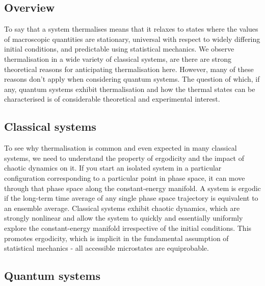 \documentclass[a4paper,10pt]{article}
\begin{document}
 \subsection{Overview}
 
To say that a system thermalises means that it relaxes to states where the values of macroscopic quantities are stationary, universal with respect to 
widely differing initial conditions, and predictable using statistical mechanics\cite{Rigol2008}. We observe thermalisation in a wide variety of classical systems, are there 
are strong theoretical reasons for anticipating thermalisation here. However, many of these reasons don't apply when considering quantum systems. The question of 
which, if any, quantum systems exhibit thermalisation and how the thermal states can be characterised is of considerable theoretical and experimental interest. 

 \subsection{Classical systems}
To see why thermalisation is common and even expected in many classical systems, we need to understand the property of ergodicity and the impact of chaotic dynamics on it. 
If you start an isolated system in a particular configuration corresponding to a particular point in phase space, it can move through that phase space along the constant-energy
manifold. A system is ergodic if the long-term time average of any single phase space trajectory is equivalent to an ensemble average.  
Classical systems  exhibit chaotic dynamics, which are strongly nonlinear and allow the system to quickly 
and essentially uniformly explore the constant-energy manifold irrespective of the initial conditions. This promotes ergodicity, which is implicit in the fundamental assumption of 
statistical mechanics - all accessible microstates are equiprobable. 

 \subsection{Quantum systems}
\end{document}
